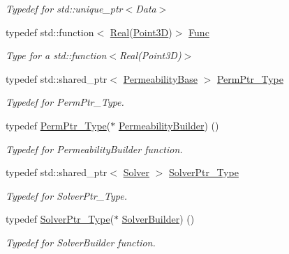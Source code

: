 \begin{DoxyCompactItemize}
\begin{DoxyCompactList}\small\item\em Typedef for std\+::unique\+\_\+ptr$<$\+Data$>$ \end{DoxyCompactList}\item 
typedef std\+::function$<$ \hyperlink{namespaceFVCode3D_a40c1f5588a248569d80aa5f867080e83}{Real}(\hyperlink{classFVCode3D_1_1Point3D}{Point3D})$>$ \hyperlink{namespaceFVCode3D_a38fa3b2520ad364d2c3d56ea5077826a}{Func}
\begin{DoxyCompactList}\small\item\em Type for a std\+::function$<$\+Real(\+Point3\+D)$>$ \end{DoxyCompactList}\item 
typedef std\+::shared\+\_\+ptr$<$ \hyperlink{classFVCode3D_1_1PermeabilityBase}{Permeability\+Base} $>$ \hyperlink{namespaceFVCode3D_aee5ae48a57366603109f90f526a645b1}{Perm\+Ptr\+\_\+\+Type}
\begin{DoxyCompactList}\small\item\em Typedef for Perm\+Ptr\+\_\+\+Type. \end{DoxyCompactList}\item 
typedef \hyperlink{namespaceFVCode3D_aee5ae48a57366603109f90f526a645b1}{Perm\+Ptr\+\_\+\+Type}($\ast$ \hyperlink{namespaceFVCode3D_ad92e05ac4c0491bab1c45e5457d2518c}{Permeability\+Builder}) ()
\begin{DoxyCompactList}\small\item\em Typedef for Permeability\+Builder function. \end{DoxyCompactList}\item 
typedef std\+::shared\+\_\+ptr$<$ \hyperlink{classFVCode3D_1_1Solver}{Solver} $>$ \hyperlink{namespaceFVCode3D_a0b32227a4e5847c2fb27215fb81d9363}{Solver\+Ptr\+\_\+\+Type}
\begin{DoxyCompactList}\small\item\em Typedef for Solver\+Ptr\+\_\+\+Type. \end{DoxyCompactList}\item 
typedef \hyperlink{namespaceFVCode3D_a0b32227a4e5847c2fb27215fb81d9363}{Solver\+Ptr\+\_\+\+Type}($\ast$ \hyperlink{namespaceFVCode3D_ae1d65e23bd2373e382d1f397337de344}{Solver\+Builder}) ()
\begin{DoxyCompactList}\small\item\em Typedef for Solver\+Builder function. \end{DoxyCompactList}\end{DoxyCompactItemize}
